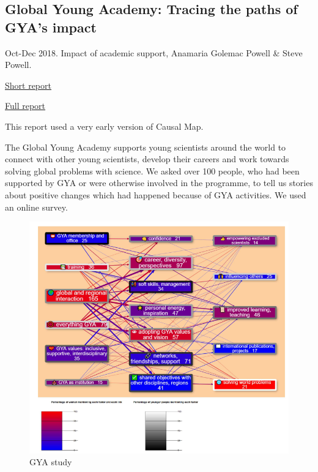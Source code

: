 \documentclass[
]{book}
\begin{document}
\hypertarget{global-young-academy-tracing-the-paths-of-gyas-impact}{%
\subsection{Global Young Academy: Tracing the paths of GYA's impact}\label{global-young-academy-tracing-the-paths-of-gyas-impact}}

Oct-Dec 2018. Impact of academic support, Anamaria Golemac Powell \& Steve Powell.

\href{https://globalyoungacademy.net/wp-content/uploads/2019/04/GYA-Impact-Analysis-2018_Final.pdf}{Short report}

\href{https://globalyoungacademy.net/wp-content/uploads/2019/04/GYA-Impact-Analyisis-2018-Technical-Appendix.pdf}{Full report}

This report used a very early version of Causal Map.

The Global Young Academy supports young scientists around the world to connect with
other young scientists, develop their careers and work towards solving global problems
with science. We asked over 100 people, who had been supported by GYA or were
otherwise involved in the programme, to tell us stories about positive changes which had
happened because of GYA activities. We used an online survey.

\begin{figure}
\centering
\includegraphics{_assets/a5fe43e040d834d29f87af7e2dc8daa9.png}
\caption{GYA study}
\end{figure}
\end{document}
